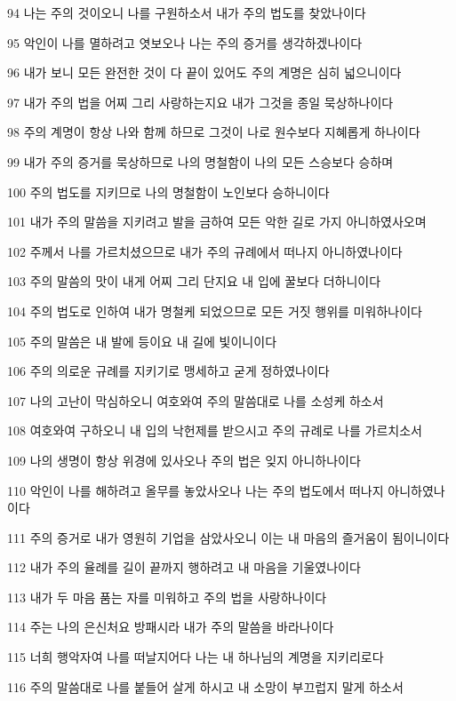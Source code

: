 \par 94 나는 주의 것이오니 나를 구원하소서 내가 주의 법도를 찾았나이다
\par 95 악인이 나를 멸하려고 엿보오나 나는 주의 증거를 생각하겠나이다
\par 96 내가 보니 모든 완전한 것이 다 끝이 있어도 주의 계명은 심히 넓으니이다
\par 97 내가 주의 법을 어찌 그리 사랑하는지요 내가 그것을 종일 묵상하나이다
\par 98 주의 계명이 항상 나와 함께 하므로 그것이 나로 원수보다 지혜롭게 하나이다
\par 99 내가 주의 증거를 묵상하므로 나의 명철함이 나의 모든 스승보다 승하며
\par 100 주의 법도를 지키므로 나의 명철함이 노인보다 승하니이다
\par 101 내가 주의 말씀을 지키려고 발을 금하여 모든 악한 길로 가지 아니하였사오며
\par 102 주께서 나를 가르치셨으므로 내가 주의 규례에서 떠나지 아니하였나이다
\par 103 주의 말씀의 맛이 내게 어찌 그리 단지요 내 입에 꿀보다 더하니이다
\par 104 주의 법도로 인하여 내가 명철케 되었으므로 모든 거짓 행위를 미워하나이다
\par 105 주의 말씀은 내 발에 등이요 내 길에 빛이니이다
\par 106 주의 의로운 규례를 지키기로 맹세하고 굳게 정하였나이다
\par 107 나의 고난이 막심하오니 여호와여 주의 말씀대로 나를 소성케 하소서
\par 108 여호와여 구하오니 내 입의 낙헌제를 받으시고 주의 규례로 나를 가르치소서
\par 109 나의 생명이 항상 위경에 있사오나 주의 법은 잊지 아니하나이다
\par 110 악인이 나를 해하려고 올무를 놓았사오나 나는 주의 법도에서 떠나지 아니하였나이다
\par 111 주의 증거로 내가 영원히 기업을 삼았사오니 이는 내 마음의 즐거움이 됨이니이다
\par 112 내가 주의 율례를 길이 끝까지 행하려고 내 마음을 기울였나이다
\par 113 내가 두 마음 품는 자를 미워하고 주의 법을 사랑하나이다
\par 114 주는 나의 은신처요 방패시라 내가 주의 말씀을 바라나이다
\par 115 너희 행악자여 나를 떠날지어다 나는 내 하나님의 계명을 지키리로다
\par 116 주의 말씀대로 나를 붙들어 살게 하시고 내 소망이 부끄럽지 말게 하소서
